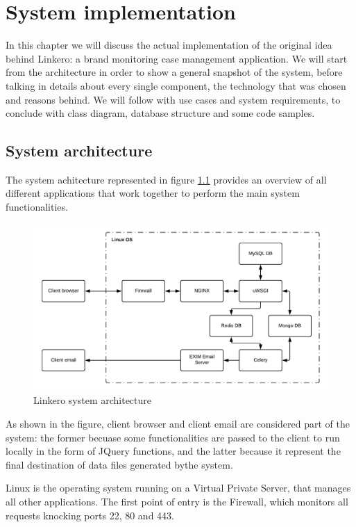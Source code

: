 \chapter{System implementation}

In this chapter we will discuss the actual implementation of the original idea
behind Linkero: a brand monitoring case management application. We will start
from the architecture in order to show a general snapshot of the system, before
talking in details about every single component, the technology that was
chosen and reasons behind. We will follow with use cases and
system requirements, to conclude with class diagram, database structure and some
code samples.

\section{System architecture}
The system achitecture represented in figure \ref{fig:sysarch} provides an
overview of all different applications that work together to perform the main
system functionalities.

\begin{figure}[h!]
\centering
\includegraphics[scale=0.7]{imgs/SystemArchitecture.pdf}
\caption{Linkero system architecture}
\label{fig:sysarch}
\end{figure}

As shown in the figure, client browser and client email are considered part of
the system: the former becuase some functionalities are passed to the client to
run locally in the form of JQuery functions, and the latter because it represent
the final destination of data files generated bythe system.

Linux is the operating system running on a Virtual Private Server, that manages
all other applications. The first point of entry is the Firewall, which monitors
all requests knocking ports 22, 80 and 443.

